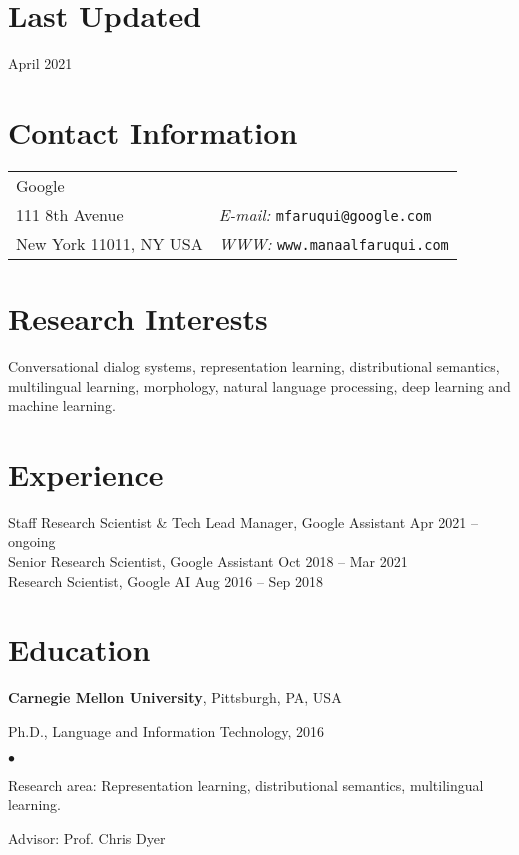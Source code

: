 \documentclass[margin,line]{res}
\newenvironment{list1}{
  \begin{list}{\ding{113}}{%
      \setlength{\itemsep}{0in}
      \setlength{\parsep}{0in} \setlength{\parskip}{0in}
      \setlength{\topsep}{0in} \setlength{\partopsep}{0in}
      \setlength{\leftmargin}{0.17in}}}{\end{list}}
\newenvironment{list2}{
  \begin{list}{$\bullet$}{%
      \setlength{\itemsep}{0in}
      \setlength{\parsep}{0in} \setlength{\parskip}{0in}
      \setlength{\topsep}{0in} \setlength{\partopsep}{0in}
      \setlength{\leftmargin}{0.2in}}}{\end{list}}
\begin{document}

\begin{resume}

\section{\sc Last Updated}

April 2021

\section{\sc Contact Information}
\vspace{.05in}
\begin{tabular}{@{}p{2in}p{4in}}
Google & \\
111 8th Avenue & {\it E-mail:}  \tt{mfaruqui@google.com}\\
New York 11011, NY USA &  {\it WWW:}  \tt{www.manaalfaruqui.com}\\
\end{tabular}

\section{\sc Research Interests}

Conversational dialog systems, representation learning,
distributional semantics, multilingual learning,
morphology, natural language processing, deep learning and machine learning.

\section{\sc Experience}
Staff Research Scientist \& Tech Lead Manager, Google Assistant \hfill {Apr 2021 -- ongoing}\\
Senior Research Scientist, Google Assistant \hfill {Oct 2018 -- Mar 2021}\\
Research Scientist, Google AI \hfill {Aug 2016 -- Sep 2018}

\section{\sc Education}
{\bf Carnegie Mellon University}, Pittsburgh, PA, USA\\
\vspace*{-.1in}
\begin{list1}
\item[] Ph.D., Language and Information Technology, 2016
\begin{list2}
\vspace*{.05in}
\item Research area: Representation learning, distributional semantics, multilingual learning.
\item Advisor:  Prof. Chris Dyer
\end{list2}
\end{list1}


\end{resume}
\end{document}
